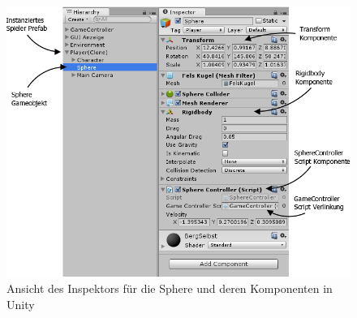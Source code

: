 \begin{figure}[H]
\centering
\caption{Ansicht des Inspektors für die Sphere und deren Komponenten in Unity}\vspace{0.25cm}
\label{Abb:SphereInspector}
\includegraphics[scale=0.45]{Bilder/SphereInspector.png}
\end{figure}

\begin{figure}[H]

\label{Abb:stSphere}
\end{figure}
